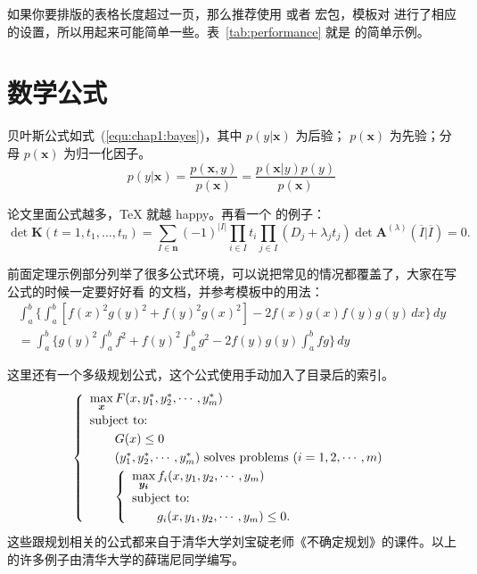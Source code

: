 如果你要排版的表格长度超过一页，那么推荐使用  或者 宏包，模板对  进行了相应的设置，所以用起来可能简单一些。表~\ref{tab:performance} 就是  的简单示例。


\section{数学公式}
\label{sec:equation}
贝叶斯公式如式~(\ref{equ:chap1:bayes})，其中 $p(y|\mathbf{x})$ 为后验；
$p(\mathbf{x})$ 为先验；分母 $p(\mathbf{x})$ 为归一化因子。
\begin{equation}
\label{equ:chap1:bayes}
p(y|\mathbf{x}) = \frac{p(\mathbf{x},y)}{p(\mathbf{x})}=
\frac{p(\mathbf{x}|y)p(y)}{p(\mathbf{x})} 
\end{equation}

论文里面公式越多，\TeX{} 就越 happy。再看一个  的例子：
\newcommand{\envert}[1]{\left\lvert#1\right\rvert} 
\begin{equation}\label{detK2}
\det\mathbf{K}(t=1,t_1,\dots,t_n)=\sum_{I\in\mathbf{n}}(-1)^{\envert{I}}
\prod_{i\in I}t_i\prod_{j\in I}(D_j+\lambda_jt_j)\det\mathbf{A}
^{(\lambda)}(\overline{I}|\overline{I})=0.
\end{equation} 

前面定理示例部分列举了很多公式环境，可以说把常见的情况都覆盖了，大家在写公式的时候一定要好好看  的文档，并参考模板中的用法：
\begin{multline*}%
\int_a^b\biggl\{\int_a^b[f(x)^2g(y)^2+f(y)^2g(x)^2]
-2f(x)g(x)f(y)g(y)\,dx\biggr\}\,dy \\
=\int_a^b\biggl\{g(y)^2\int_a^bf^2+f(y)^2
\int_a^b g^2-2f(y)g(y)\int_a^b fg\biggr\}\,dy
\end{multline*}

这里还有一个多级规划公式，这个公式使用手动加入了目录后的索引。
\begin{equation}\label{bilevel}
\left\{\begin{array}{l}
\max\limits_{{\mbox{\footnotesize\boldmath $x$}}} F(x,y_1^*,y_2^*,\cdots,y_m^*)\\[0.2cm]
\mbox{subject to:}\\[0.1cm]
\qquad G(x)\le 0\\[0.1cm]
\qquad(y_1^*,y_2^*,\cdots,y_m^*)\mbox{ solves problems }(i=1,2,\cdots,m)\\[0.1cm]
\qquad\left\{\begin{array}{l}
\max\limits_{{\mbox{\footnotesize\boldmath $y_i$}}}f_i(x,y_1,y_2,\cdots,y_m)\\[0.2cm]
\mbox{subject to:}\\[0.1cm]
\qquad g_i(x,y_1,y_2,\cdots,y_m)\le 0.
\end{array}\right.
\end{array}\right.
\end{equation}
这些跟规划相关的公式都来自于清华大学刘宝碇老师《不确定规划》的课件。以上的许多例子由清华大学的薛瑞尼同学编写。


